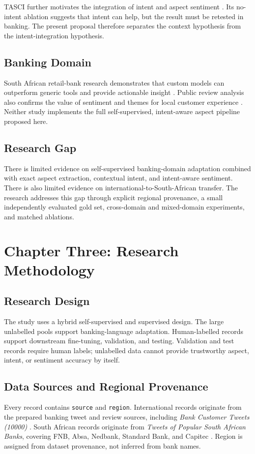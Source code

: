 \documentclass[11pt,a4paper]{article}
\begin{document}
TASCI further motivates the integration of intent and aspect sentiment \citep{chaudhry2025}. Its no-intent ablation suggests that intent can help, but the result must be retested in banking. The present proposal therefore separates the context hypothesis from the intent-integration hypothesis.

\subsection{Banking Domain}
South African retail-bank research demonstrates that custom models can outperform generic tools and provide actionable insight \citep{kazmaier2020}. Public review analysis also confirms the value of sentiment and themes for local customer experience \citep{semenya2024}. Neither study implements the full self-supervised, intent-aware aspect pipeline proposed here.

\subsection{Research Gap}
There is limited evidence on self-supervised banking-domain adaptation combined with exact aspect extraction, contextual intent, and intent-aware sentiment. There is also limited evidence on international-to-South-African transfer. The research addresses this gap through explicit regional provenance, a small independently evaluated gold set, cross-domain and mixed-domain experiments, and matched ablations.

\clearpage
\section{Chapter Three: Research Methodology}
\subsection{Research Design}
The study uses a hybrid self-supervised and supervised design. The large unlabelled pools support banking-language adaptation. Human-labelled records support downstream fine-tuning, validation, and testing. Validation and test records require human labels; unlabelled data cannot provide trustworthy aspect, intent, or sentiment accuracy by itself.

\subsection{Data Sources and Regional Provenance}
Every record contains \texttt{source} and \texttt{region}. International records originate from the prepared banking tweet and review sources, including \textit{Bank Customer Tweets (10000)} \citep{batoogdataset}. South African records originate from \textit{Tweets of Popular South African Banks}, covering FNB, Absa, Nedbank, Standard Bank, and Capitec \citep{blomerusdataset}. Region is assigned from dataset provenance, not inferred from bank names.
\end{document}
